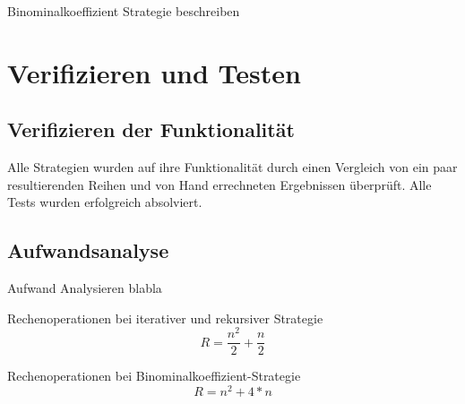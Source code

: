 \documentclass[11pt]{scrartcl}
\begin{document}
		Binominalkoeffizient Strategie beschreiben

\section{Verifizieren und Testen}
\label{sec:vertests}

	\subsection{Verifizieren der Funktionalität}
		\label{sec:verfun}
		
		Alle Strategien wurden auf ihre Funktionalität durch einen Vergleich von ein paar resultierenden Reihen und von Hand errechneten Ergebnissen überprüft.
		Alle Tests wurden erfolgreich absolviert.
	
	\subsection{Aufwandsanalyse}
		\label{sec:aufwand}
		
		Aufwand Analysieren blabla

		Rechenoperationen bei iterativer und rekursiver Strategie
		\begin{equation*}
		R = \frac{n^2}{2}+\frac{n}{2}
		\end{equation*}

		Rechenoperationen bei Binominalkoeffizient-Strategie
		\begin{equation*}
		R = n^2+4*n
		\end{equation*}
\end{document}
